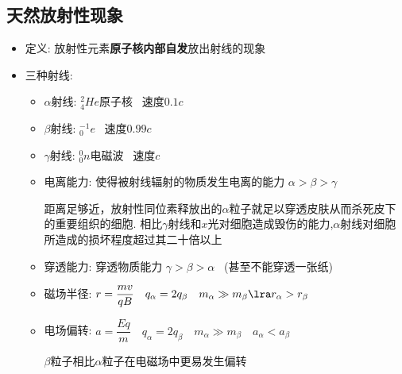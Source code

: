 \documentclass{article}
\begin{document}
\subsection{天然放射性现象}
\begin{itemize}
    \item 定义: 放射性元素\textbf{原子核内部自发}放出射线的现象
    \item 三种射线:
          \begin{itemize}
              \item[] $\alpha$射线: $^{2}_{4}He$原子核 \, 速度$0.1c$
              \item[] $\beta$射线: $^{-1}_{0}e$ \, 速度$0.99c$
              \item[] $\gamma$射线: $^{0}_{0}n$电磁波 \, 速度$c$
              \item[] 电离能力: 使得被射线辐射的物质发生电离的能力 $\alpha > \beta > \gamma$

                  \vspace{-1em}
                  \begin{adjustbox}{minipage=0.91\linewidth, bgcolor=gray!20, padding=1em}
                      \small
                      距离足够近，放射性同位素释放出的$\alpha$粒子就足以穿透皮肤从而杀死皮下的重要组织的细胞.
                      相比$\gamma$射线和$x$光对细胞造成毁伤的能力,$\alpha$射线对细胞所造成的损坏程度超过其二十倍以上
                  \end{adjustbox}
                  \vspace{-1em}

              \item[] 穿透能力: 穿透物质能力 $\gamma > \beta > \alpha$ \, (甚至不能穿透一张纸)
              \item[] 磁场半径: $ r = \dfrac{mv}{qB} \quad q_{\alpha} = 2 q_{\beta}
                      \quad m_{\alpha} \gg m_{\beta} \lra r_{\alpha} > r_{\beta} $
              \item[] 电场偏转: $ a = \dfrac{Eq}{m} \quad q_{\alpha} = 2 q_{\beta}
                      \quad m_{\alpha} \gg m_{\beta} \quad a_{\alpha} < a_{\beta} $

                  \vspace{-1em}
                  \begin{adjustbox}{minipage=0.4\linewidth, bgcolor=gray!20, padding=1em}
                      \small
                      $\beta$粒子相比$\alpha$粒子在电磁场中更易发生偏转
                  \end{adjustbox}
                  \vspace{-1em}
          \end{itemize}
\end{itemize}
\end{document}
